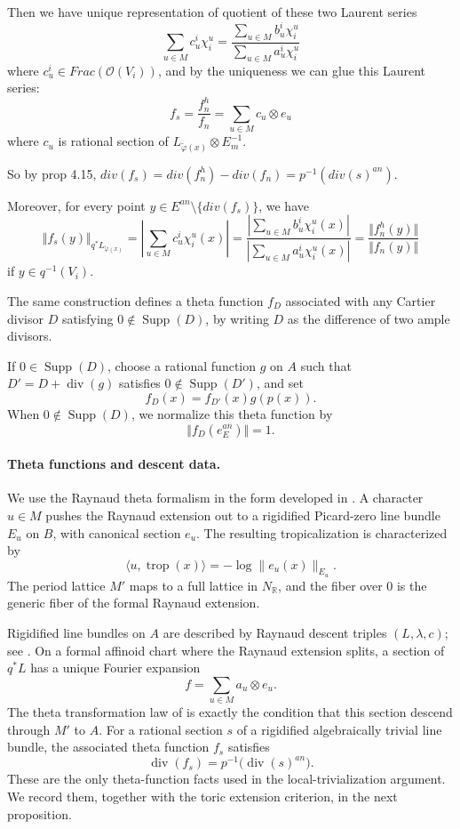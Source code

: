 \documentclass[10pt,a4paper]{amsart}
\theoremstyle{plain}
\theoremstyle{plain}
\numberwithin{equation}{section}
\begin{document}
Then we have unique representation of quotient of these two Laurent series
$$\sum_{u\in M}c_u^i\chi^u_i=\frac{\sum_{u\in M}b_u^i\chi^u_i}{\sum_{u\in M}a_u^i\chi^u_i}$$
where $c_u^i\in Frac(\mathscr{O}(V_i))$, and by the uniqueness we can glue this Laurent series:
$$f_s=\frac{f_n^h}{f_n}=\sum_{u\in M}c_u\otimes e_u$$
where $c_u$ is rational section of $L_{\widetilde{\varphi}(x)}\otimes E_m^{-1}$.


So by prop 4.15, $div(f_s)=div(f_n^h)-div(f_n)=p^{-1}(div(s)^{an})$.


Moreover, for every point $y\in E^{an}\setminus\{div(f_s)\}$,
we have 
$$\Vert f_s(y)\Vert_{q^*L_{\widetilde{\varphi}(x)}}=|\sum_{u\in M}c_u^i\chi^u_i(x)|=\frac{|\sum_{u\in M}b_u^i\chi^u_i(x)|}{|\sum_{u\in M}a_u^i\chi^u_i(x)|}=\frac{\Vert f_n^h(y)\Vert}{\Vert f_n(y)\Vert}$$
if $y\in q^{-1}(V_i)$.


The same construction defines a theta function \(f_D\) associated with any
Cartier divisor \(D\) satisfying \(0\notin \operatorname{Supp}(D)\), by writing
\(D\) as the difference of two ample divisors.

If \(0\in \operatorname{Supp}(D)\), choose a rational function \(g\) on \(A\)
such that \(D'=D+\operatorname{div}(g)\) satisfies
\(0\notin \operatorname{Supp}(D')\), and set
\[
f_D(x)=f_{D'}(x)g(p(x)).
\]
When \(0\notin \operatorname{Supp}(D)\), we normalize this theta function by
\[
\Vert f_D(e_E^{an})\Vert=1 .
\]
\fi
\addtocounter{thm}{12}

\paragraph{Theta functions and descent data.}
We use the Raynaud theta formalism in the form developed in
\cite[Sections~3.3--3.6]{Ku1}.  A character \(u\in M\) pushes the Raynaud
extension out to a rigidified Picard-zero line bundle \(E_u\) on \(B\), with
canonical section \(e_u\).  The resulting tropicalization is characterized by
\[
\langle u,\operatorname{trop}(x)\rangle
=-\log\|e_u(x)\|_{E_u}.
\]
The period lattice \(M'\) maps to a full lattice in \(N_{\mathbb R}\), and the
fiber over \(0\) is the generic fiber of the formal Raynaud extension.

Rigidified line bundles on \(A\) are described by Raynaud descent triples
\((L,\lambda,c)\); see \cite[Theorem~3.6]{Ku1}.  On a formal affinoid chart
where the Raynaud extension splits, a section of \(q^*L\) has a unique Fourier
expansion
\[
f=\sum_{u\in M}a_u\otimes e_u.
\]
The theta transformation law of \cite[Proposition~3.13]{Ku1} is exactly the
condition that this section descend through \(M'\) to \(A\).  For a rational
section \(s\) of a rigidified algebraically trivial line bundle, the associated
theta function \(f_s\) satisfies
\[
\operatorname{div}(f_s)
=p^{-1}\bigl(\operatorname{div}(s)^{an}\bigr).
\]
These are the only theta-function facts used in the local-trivialization
argument.  We record them, together with the toric extension criterion, in the
next proposition.
\end{document}
